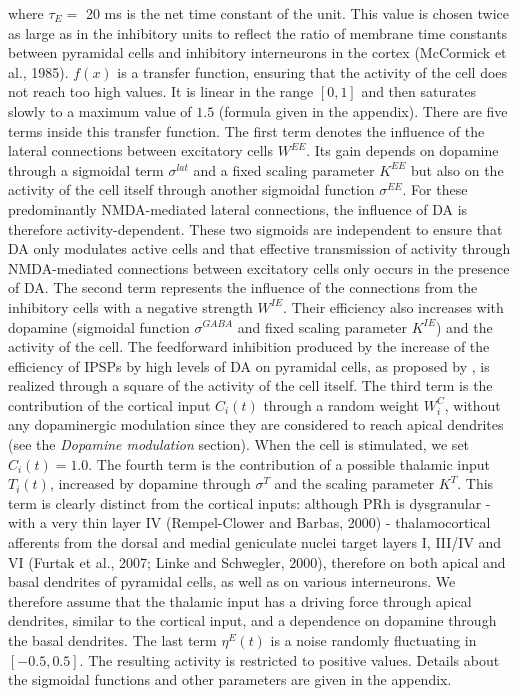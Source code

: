 \documentclass[
  11pt,
  a4paper,
]{scrbook}
\begin{document}
where \(\tau_E =\) 20 ms is the net time constant of the unit. This
value is chosen twice as large as in the inhibitory units to reflect the
ratio of membrane time constants between pyramidal cells and inhibitory
interneurons in the cortex (McCormick et al., 1985). \(f (x)\) is a
transfer function, ensuring that the activity of the cell does not reach
too high values. It is linear in the range \([0, 1]\) and then saturates
slowly to a maximum value of \(1.5\) (formula given in the appendix).
There are five terms inside this transfer function. The first term
denotes the influence of the lateral connections between excitatory
cells \(W^{EE}\). Its gain depends on dopamine through a sigmoidal term
\(\sigma^{lat}\) and a fixed scaling parameter \(K^{EE}\) but also on
the activity of the cell itself through another sigmoidal function
\(\sigma^{EE}\). For these predominantly NMDA-mediated lateral
connections, the influence of DA is therefore activity-dependent. These
two sigmoids are independent to ensure that DA only modulates active
cells and that effective transmission of activity through NMDA-mediated
connections between excitatory cells only occurs in the presence of DA.
The second term represents the influence of the connections from the
inhibitory cells with a negative strength \(W^{IE}\). Their efficiency
also increases with dopamine (sigmoidal function \(\sigma^{GABA}\) and
fixed scaling parameter \(K^{IE}\)) and the activity of the cell. The
feedforward inhibition produced by the increase of the efficiency of
IPSPs by high levels of DA on pyramidal cells, as proposed by , is
realized through a square of the activity of the cell itself. The third
term is the contribution of the cortical input \(C_i (t)\) through a
random weight \(W^{C}_i\), without any dopaminergic modulation since
they are considered to reach apical dendrites (see the \emph{Dopamine
modulation} section). When the cell is stimulated, we set
\(C_i(t) = 1.0\). The fourth term is the contribution of a possible
thalamic input \(T_i (t)\), increased by dopamine through \(\sigma^{T}\)
and the scaling parameter \(K^{T}\). This term is clearly distinct from
the cortical inputs: although PRh is dysgranular - with a very thin
layer IV (Rempel-Clower and Barbas, 2000) - thalamocortical afferents
from the dorsal and medial geniculate nuclei target layers I, III/IV and
VI (Furtak et al., 2007; Linke and Schwegler, 2000), therefore on both
apical and basal dendrites of pyramidal cells, as well as on various
interneurons. We therefore assume that the thalamic input has a driving
force through apical dendrites, similar to the cortical input, and a
dependence on dopamine through the basal dendrites. The last term
\(\eta^E (t)\) is a noise randomly fluctuating in \([- 0.5, 0.5]\). The
resulting activity is restricted to positive values. Details about the
sigmoidal functions and other parameters are given in the appendix.
\end{document}
